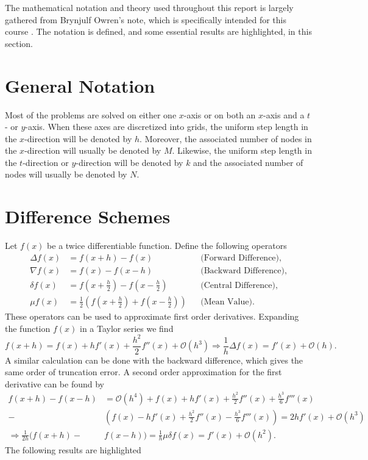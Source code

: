 The mathematical notation and theory used throughout this report is largely gathered from Brynjulf Owren's note, which is specifically intended for this course \cite{Owren}. The notation is defined, and some essential results are highlighted, in this section.

\section{General Notation}
Most of the problems are solved on either one $x$-axis or on both an $x$-axis and a $t$- or $y$-axis. When these axes are discretized into grids, the uniform step length in the $x$-direction will be denoted by $h$. Moreover, the associated number of nodes in the $x$-direction will usually be denoted by $M$. Likewise, the uniform step length in the $t$-direction or $y$-direction will be denoted by $k$ and the associated number of nodes will usually be denoted by $N$. 

\section{Difference Schemes}
\label{section_2.2}

Let $f(x)$ be a twice differentiable function. Define the following operators 
\begin{align*}
    \Delta f(x) &= f(x + h) - f(x) &&\text{(Forward Difference)}, \\
    \nabla f(x) &= f(x) - f(x - h) &&\text{(Backward Difference)}, \\
    \delta f(x) &= f\left(x + \frac{h}{2}\right) - f\left(x - \frac{h}{2}\right) &&\text{(Central Difference)}, \\
    \mu f(x) &= \frac{1}{2}\left(f\left(x+\frac{h}{2}\right) + f\left(x-\frac{h}{2}\right)\right) &&\text{(Mean Value)}.
\end{align*}
These operators can be used to approximate first order derivatives. Expanding the function $f(x)$ in a Taylor series we find
\begin{equation*}
    f(x+h) = f(x) + hf'(x) + \frac{h^2}{2}f''(x) + \mathcal{O}(h^3) \Rightarrow \frac{1}{h}\Delta f(x) = f'(x) + \mathcal{O}(h).
\end{equation*}
A similar calculation can be done with the backward difference, which gives the same order of truncation error. A second order approximation for the first derivative can be found by
\begin{equation*}
\begin{split}
    f(x+h)-f(x-h) &= \mathcal{O}(h^4) + f(x)+hf'(x) + \frac{h^2}{2}f''(x) + \frac{h^3}{6}f'''(x)\\ - &\left(f(x) - hf'(x)+\frac{h^2}{2}f''(x)-\frac{h^3}{6}f'''(x)\right) = 2hf'(x) + \mathcal{O}(h^3) \\
    \Rightarrow \frac{1}{2h}(f(x+h)-&f(x-h)) = \frac{1}{h}\mu \delta f(x) = f'(x) + \mathcal{O}(h^2).
\end{split}
\end{equation*}
The following results are highlighted

